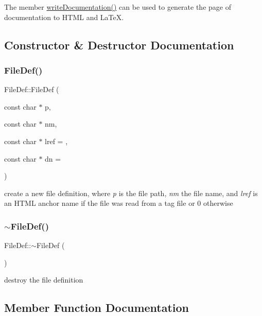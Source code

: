 The member \mbox{\hyperlink{class_file_def_a7a73cf8448a6995be00369858d4768e8}{write\+Documentation()}} can be used to generate the page of documentation to H\+T\+ML and La\+TeX. 

\subsection{Constructor \& Destructor Documentation}
\mbox{\label{class_file_def_aa0f1d4c412599b7c03d214c939e1ca95}} 
\subsubsection{\texorpdfstring{FileDef()}{FileDef()}}
{\footnotesize\ttfamily File\+Def\+::\+File\+Def (\begin{DoxyParamCaption}\item[{const char $\ast$}]{p,  }\item[{const char $\ast$}]{nm,  }\item[{const char $\ast$}]{lref = {},  }\item[{const char $\ast$}]{dn = {} }\end{DoxyParamCaption})}

create a new file definition, where {\itshape p} is the file path, {\itshape nm} the file name, and {\itshape lref} is an H\+T\+ML anchor name if the file was read from a tag file or 0 otherwise \mbox{\label{class_file_def_a5ed8a95230184de0f82d21bf08f4ac0a}} 
\subsubsection{\texorpdfstring{$\sim$FileDef()}{~FileDef()}}
{\footnotesize\ttfamily File\+Def\+::$\sim$\+File\+Def (\begin{DoxyParamCaption}{ }\end{DoxyParamCaption})}

destroy the file definition 

\subsection{Member Function Documentation}
\mbox{\label{class_file_def_ad44d91d874c4713d198a8e4b862ee48f}} 
